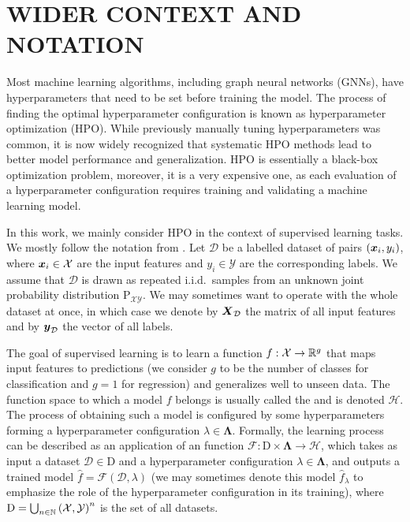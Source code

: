 \section{\uppercase{Wider context and Notation}}

Most machine learning algorithms, including graph neural networks (GNNs), have hyperparameters that need to be set before training the model. The process of finding the optimal hyperparameter configuration is known as hyperparameter optimization (HPO). While previously manually tuning hyperparameters was common, it is now widely recognized that systematic HPO methods lead to better model performance and generalization. HPO is essentially a black-box optimization problem, moreover, it is a very expensive one, as each evaluation of a hyperparameter configuration requires training and validating a machine learning model.

In this work, we mainly consider HPO in the context of supervised learning tasks. We mostly follow the notation from \cite{bischl_hyperparameter_2023}. Let \( \mathcal{D} \) be a labelled dataset of pairs \( \left( \boldsymbol{x}_i, y_i \right) \), where \( \boldsymbol{x}_i \in \mathcal{X} \) are the input features and \( y_i \in \mathcal{Y} \) are the corresponding labels. We assume that \( \mathcal{D} \) is drawn as repeated i.i.d.\ samples from an unknown joint probability distribution \( \mathrm{P}_{\mathcal{X}\mathcal{Y}} \). We may sometimes want to operate with the whole dataset at once, in which case we denote by \( \boldsymbol{X}_\mathcal{D} \) the matrix of all input features and by \( \boldsymbol{y}_\mathcal{D} \) the vector of all labels.

The goal of supervised learning is to learn a function \( f: \mathcal{X} \to \mathbb{R}^g \) that maps input features to predictions (we consider \( g \) to be the number of classes for classification and \( g = 1 \) for regression) and generalizes well to unseen data. The function space to which a model \( f \) belongs is usually called the  and is denoted \( \mathscr{H} \). The process of obtaining such a model is configured by some hyperparameters forming a hyperparameter configuration \( \lambda \in \boldsymbol\Lambda \). Formally, the learning process can be described as an application of an  function \( \mathscr{F} : \mathrm{D} \times \boldsymbol\Lambda \to \mathscr{H} \), which takes as input a dataset \( \mathcal{D} \in \mathrm{D} \) and a hyperparameter configuration \( \lambda \in \boldsymbol\Lambda \), and outputs a trained model \( \hat{f} = \mathscr{F} ( \mathcal{D}, \lambda ) \) (we may sometimes denote this model \( \hat{f}_\lambda \) to emphasize the role of the hyperparameter configuration in its training), where \( \mathrm{D} = \bigcup_{n \in \mathbb{N}} \left( \mathcal{X}, \mathcal{Y} \right)^n \) is the set of all datasets.

